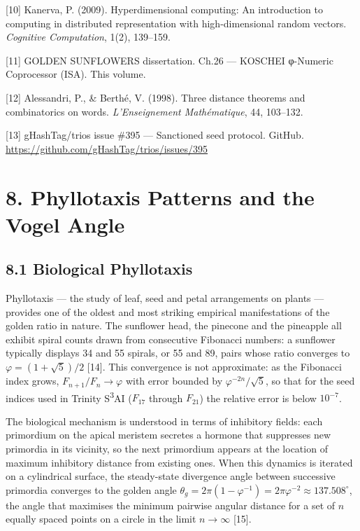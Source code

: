 [10] Kanerva, P. (2009). Hyperdimensional
computing: An introduction to computing in
distributed representation with high-dimensional
random vectors. \emph{Cognitive Computation},
1(2), 139--159.

[11] GOLDEN SUNFLOWERS dissertation. Ch.26 ---
KOSCHEI φ-Numeric Coprocessor (ISA). This volume.

[12] Alessandri, P., \& Berthé, V. (1998).
Three distance theorems and combinatorics on
words. \emph{L'Enseignement Mathématique}, 44,
103--132.

[13] gHashTag/trios issue \#395 --- Sanctioned
seed protocol. GitHub.
\url{https://github.com/gHashTag/trios/issues/395}

\section{8. Phyllotaxis Patterns and the Vogel
Angle}\label{fa_02:phyllotaxis-and-vogel-angle}

\subsection{8.1 Biological
Phyllotaxis}\label{fa_02:biological-phyllotaxis}

Phyllotaxis --- the study of leaf, seed and petal
arrangements on plants --- provides one of the
oldest and most striking empirical manifestations
of the golden ratio in nature. The sunflower
head, the pinecone and the pineapple all exhibit
spiral counts drawn from consecutive Fibonacci
numbers: a sunflower typically displays 34 and 55
spirals, or 55 and 89, pairs whose ratio converges
to \(\varphi = (1+\sqrt{5})/2\) [14]. This
convergence is not approximate: as the Fibonacci
index grows, \(F_{n+1}/F_n \to \varphi\) with
error bounded by \(\varphi^{-2n}/\sqrt{5}\), so
that for the seed indices used in Trinity
S\textsuperscript{3}AI (\(F_{17}\) through
\(F_{21}\)) the relative error is below
\(10^{-7}\).

The biological mechanism is understood in terms
of inhibitory fields: each primordium on the
apical meristem secretes a hormone that suppresses
new primordia in its vicinity, so the next
primordium appears at the location of maximum
inhibitory distance from existing ones. When this
dynamics is iterated on a cylindrical surface, the
steady-state divergence angle between successive
primordia converges to the golden angle
\(\theta_g = 2\pi(1 - \varphi^{-1}) = 2\pi
\varphi^{-2} \approx 137.508^{\circ}\), the angle
that maximises the minimum pairwise angular
distance for a set of \(n\) equally spaced points
on a circle in the limit \(n \to \infty\) [15].

